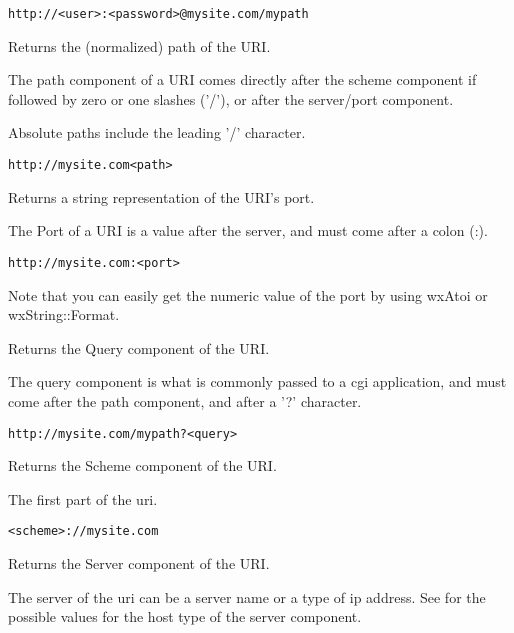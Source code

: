 \tt{http://<user>:<password>@mysite.com/mypath}


\label{wxurigetpath}


Returns the (normalized) path of the URI.

The path component of a URI comes
directly after the scheme component
if followed by zero or one slashes ('/'),
or after the server/port component.

Absolute paths include the leading '/'
character.

\tt{http://mysite.com<path>}

\label{wxurigetport}


Returns a string representation of the URI's port.

The Port of a URI is a value after the server, and 
must come after a colon (:).

\tt{http://mysite.com:<port>}

Note that you can easily get the numeric value of the port
by using wxAtoi or wxString::Format.

\label{wxurigetquery}


Returns the Query component of the URI.

The query component is what is commonly passed to a 
cgi application, and must come after the path component,
and after a '?' character.

\tt{http://mysite.com/mypath?<query>}


\label{wxurigetscheme}


Returns the Scheme component of the URI.

The first part of the uri.

\tt{<scheme>://mysite.com}


\label{wxurigetserver}


Returns the Server component of the URI.

The server of the uri can be a server name or 
a type of ip address.  See
 for the
possible values for the host type of the 
server component.

